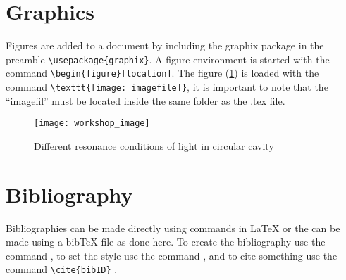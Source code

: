 \documentclass{article} 	%
\numberwithin{equation}{section}
\begin{document}
	\section{Graphics}
	Figures are added to a document by including the graphix package in the preamble \verb|\usepackage{graphix}|. A figure environment is started with the command \verb|\begin{figure}[location]|.  The figure (\ref{fig:workshop_image}) is loaded with the command \verb|\texttt{[image: imagefile]}|, it is important to note that the ``imagefil'' must be located inside the same folder as the .tex file.
	\begin{figure}[htb]			%
		\centering
		\texttt{[image: workshop\_image]}
		\caption{Different resonance conditions of light in circular cavity} \cite{frenkel_fine_2013}  \label{fig:workshop_image}
	\end{figure}

	\section{Bibliography}
	Bibliographies can be made directly using commands in \LaTeX{} or the can be made using a bib\TeX{} file as done here.  To create the bibliography use the command \verb||, to set the style use the command \verb||, and to cite something use the command \verb|\cite{bibID}| \cite{frenkel_-chip_2016}.
	
	
\end{document}
